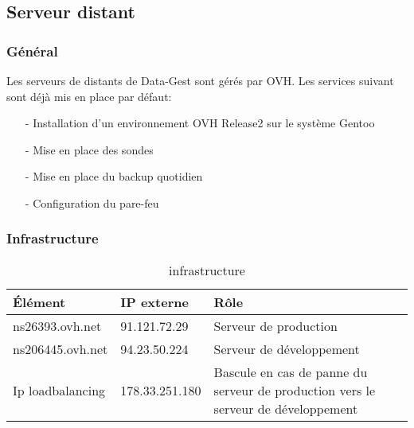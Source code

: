 \subsection{Serveur distant}
\subsubsection{Général}
Les serveurs de distants de Data-Gest sont gérés par OVH. Les services suivant sont déjà mis en place par défaut: 
\begin{itemize}
\item [-] Installation d'un environnement OVH Release2 sur le système Gentoo
\item [-] Mise en place des sondes
\item [-] Mise en place du backup quotidien
\item [-] Configuration du pare-feu
\end{itemize}

\subsubsection{Infrastructure}

\begin{table}[htbp]
\renewcommand{\tabularxcolumn}[1]{>{\arraybackslash}m{#1}}
\begin{tabularx}{\textwidth}{llX}
  \toprule
  Élément & IP externe & Rôle\\
  \midrule
  ns26393.ovh.net & 91.121.72.29 & Serveur de production\\
  ns206445.ovh.net & 94.23.50.224 & Serveur de développement\\
  Ip loadbalancing & 178.33.251.180 & Bascule en cas de panne du serveur de production vers le serveur de développement\\
  \bottomrule
\end{tabularx}
 \caption{\label{tab:Infrastructure de serveur distant}infrastructure}
\end{table}

